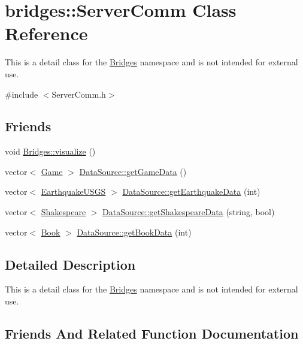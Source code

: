 \hypertarget{classbridges_1_1_server_comm}{}\section{bridges\+:\+:Server\+Comm Class Reference}
\label{classbridges_1_1_server_comm}


This is a detail class for the \hyperlink{namespacebridges_1_1_bridges}{Bridges} namespace and is not intended for external use.  




{\ttfamily \#include $<$Server\+Comm.\+h$>$}

\subsection*{Friends}
\begin{DoxyCompactItemize}
\item 
void \hyperlink{classbridges_1_1_server_comm_a0a9e3be9faab475909293766dcda4779}{Bridges\+::visualize} ()
\item 
vector$<$ \hyperlink{classbridges_1_1_game}{Game} $>$ \hyperlink{classbridges_1_1_server_comm_aaf9715981dcd976f93624bd3aa22183f}{Data\+Source\+::get\+Game\+Data} ()
\item 
vector$<$ \hyperlink{classbridges_1_1_earthquake_u_s_g_s}{Earthquake\+U\+S\+GS} $>$ \hyperlink{classbridges_1_1_server_comm_a29b51cd765158c2022cdf624302a6f41}{Data\+Source\+::get\+Earthquake\+Data} (int)
\item 
vector$<$ \hyperlink{classbridges_1_1_shakespeare}{Shakespeare} $>$ \hyperlink{classbridges_1_1_server_comm_a1f240eea3d39812606c0b3d10bdc757c}{Data\+Source\+::get\+Shakespeare\+Data} (string, bool)
\item 
vector$<$ \hyperlink{classbridges_1_1_book}{Book} $>$ \hyperlink{classbridges_1_1_server_comm_a88217d2db8656b5bc4a5e32feb9fd2d8}{Data\+Source\+::get\+Book\+Data} (int)
\end{DoxyCompactItemize}


\subsection{Detailed Description}
This is a detail class for the \hyperlink{namespacebridges_1_1_bridges}{Bridges} namespace and is not intended for external use. 

\subsection{Friends And Related Function Documentation}
\hypertarget{classbridges_1_1_server_comm_a0a9e3be9faab475909293766dcda4779}{}\label{classbridges_1_1_server_comm_a0a9e3be9faab475909293766dcda4779} 
